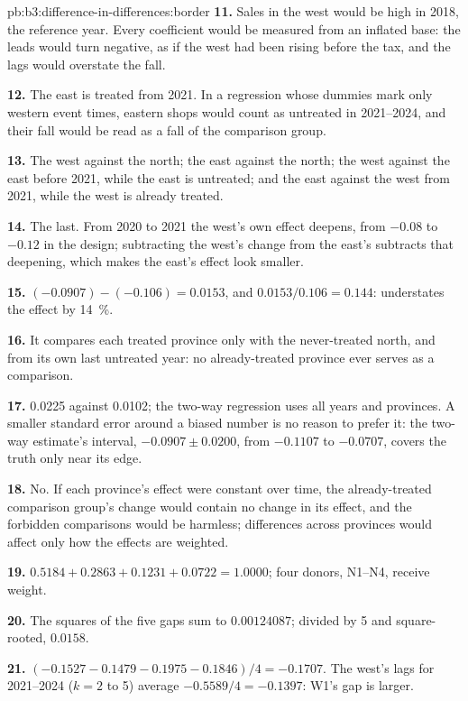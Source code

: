 \begin{solution}{pb:b3:difference-in-differences:border}
\textbf{11.} Sales in the west would be high in 2018, the reference year. Every
coefficient would be measured from an inflated base: the leads would turn
negative, as if the west had been rising before the tax, and the lags would
overstate the fall.

\textbf{12.} The east is treated from 2021. In a regression whose dummies mark
only western event times, eastern shops would count as untreated in 2021--2024,
and their fall would be read as a fall of the comparison group.

\textbf{13.} The west against the north; the east against the north; the west
against the east before 2021, while the east is untreated; and the east
against the west from 2021, while the west is already treated.

\textbf{14.} The last. From 2020 to 2021 the west's own effect deepens, from
$-0.08$ to $-0.12$ in the design; subtracting the west's change from the east's
subtracts that deepening, which makes the east's effect look smaller.

\textbf{15.} $(-0.0907) - (-0.106) = 0.0153$, and $0.0153/0.106 = 0.144$:  understates the effect by 14~\%. %

\textbf{16.} It compares each treated province only with the never-treated north,
and from its own last untreated year: no already-treated province ever serves
as a comparison.

\textbf{17.} 0.0225 against 0.0102; the two-way regression uses all years and
provinces. A smaller standard error around a biased number is no reason to
prefer it: the two-way estimate's interval, $-0.0907 \pm 0.0200$, from
$-0.1107$ to $-0.0707$, covers the truth only near its edge.

\textbf{18.} No. If each province's effect were constant over time, the
already-treated comparison group's change would contain no change in its
effect, and the forbidden comparisons would be harmless; differences across
provinces would affect only how the effects are weighted.

\textbf{19.} $0.5184 + 0.2863 + 0.1231 + 0.0722 = 1.0000$; four donors, N1--N4,
receive weight. %

\textbf{20.} The squares of the five gaps sum to $0.00124087$; divided by 5 and
square-rooted, $0.0158$. %

\textbf{21.} $(-0.1527 - 0.1479 - 0.1975 - 0.1846)/4 = -0.1707$. The west's lags
for 2021--2024 ($k = 2$ to 5) average $-0.5589/4 = -0.1397$: W1's gap is larger.


\end{solution}
